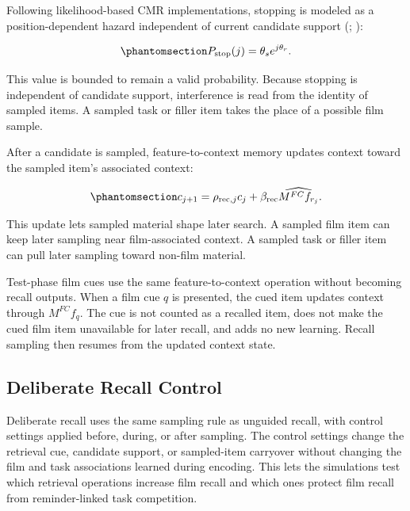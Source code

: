 \documentclass[
  man,
  floatsintext,
  longtable,
  nolmodern,
  notxfonts,
  notimes,
  draftfirst,
  colorlinks=true,linkcolor=blue,citecolor=blue,urlcolor=blue]{apa7}
\begin{document}
Following likelihood-based CMR implementations, stopping is modeled as a
position-dependent hazard independent of current candidate support
(;
):

\begin{equation}\phantomsection\label{eq-stopping}{
P_{\mathrm{stop}}(j) = \theta_s e^{j\theta_r}.
}\end{equation}

This value is bounded to remain a valid probability. Because stopping is
independent of candidate support, interference is read from the identity
of sampled items. A sampled task or filler item takes the place of a
possible film sample.

After a candidate is sampled, feature-to-context memory updates context
toward the sampled item's associated context:

\begin{equation}\phantomsection\label{eq-recall-context-update}{
c_{j+1} =
\rho_{\mathrm{rec},j} c_j +
\beta_{\mathrm{rec}} \widehat{M^{FC} f_{r_j}} .
}\end{equation}

This update lets sampled material shape later search. A sampled film
item can keep later sampling near film-associated context. A sampled
task or filler item can pull later sampling toward non-film material.

Test-phase film cues use the same feature-to-context operation without
becoming recall outputs. When a film cue \(q\) is presented, the cued
item updates context through \(M^{FC} f_q\). The cue is not counted as a
recalled item, does not make the cued film item unavailable for later
recall, and adds no new learning. Recall sampling then resumes from the
updated context state.

\subsection{Deliberate Recall Control}\label{deliberate-recall-control}

Deliberate recall uses the same sampling rule as unguided recall, with
control settings applied before, during, or after sampling. The control
settings change the retrieval cue, candidate support, or sampled-item
carryover without changing the film and task associations learned during
encoding. This lets the simulations test which retrieval operations
increase film recall and which ones protect film recall from
reminder-linked task competition.
\end{document}
